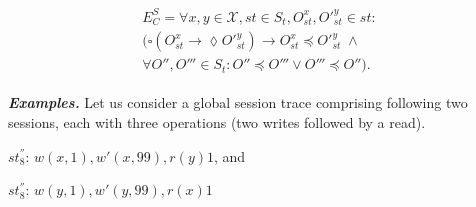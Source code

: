 \documentclass[journal,compsoc]{IEEEtran}
\begin{document}
\begin{align}\label{eqn:SC}
\begin{split}
      E^S_C =  %
   \forall x,y \in \mathcal{X}, \mathit{st} \in \mathit{S_t}, O_\mathit{st}^x, O'^{y}_\mathit{st} \in \mathit{st}:  \\
     \big( \square \left( O_\mathit{st}^x \rightarrow \lozenge O'^{y}_\mathit{st} \right)
 \rightarrow O_\mathit{st}^x \preccurlyeq O'^{y}_\mathit{st}  \; \wedge
 \\
 \forall O'', O''' \in \mathit{S_t}:
 O'' \preccurlyeq O''' \vee O''' \preccurlyeq O'' \big). %
\end{split}
\end{align}

\noindent \emph{\textbf{Examples.}}
Let us consider a global session trace comprising following two sessions, each with three operations (two writes followed by a read).

 $\mathit{st}_8^{''}$:   $w(x, 1), w'(x,99), r(y){1}$, and

 $\mathit{st}_8^{''}$:  $w(y, 1), w'(y,99), r(x){1}$
\end{document}
